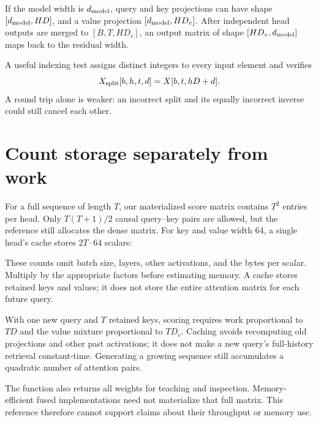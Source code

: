 
If the model width is $d_{\rm model}$, query and key projections can have shape $[d_{\rm model},HD]$, and a value projection $[d_{\rm model},HD_v]$. After independent head outputs are merged to $[B,T,HD_v]$, an output matrix of shape $[HD_v,d_{\rm model}]$ maps back to the residual width.

A useful indexing test assigns distinct integers to every input element and verifies
\begin{equation}
X_{\rm split}[b,h,t,d]=X[b,t,hD+d].
\end{equation}
A round trip alone is weaker: an incorrect split and its equally incorrect inverse could still cancel each other.

\section{Count storage separately from work}

For a full sequence of length $T$, our materialized score matrix contains $T^2$ entries per head. Only $T(T+1)/2$ causal query--key pairs are allowed, but the reference still allocates the dense matrix. For key and value width 64, a single head's cache stores $2T\cdot64$ scalars:

\begin{center}\end{center}

These counts omit batch size, layers, other activations, and the bytes per scalar. Multiply by the appropriate factors before estimating memory. A cache stores retained keys and values; it does not store the entire attention matrix for each future query.

With one new query and $T$ retained keys, scoring requires work proportional to $TD$ and the value mixture proportional to $TD_v$. Caching avoids recomputing old projections and other past activations; it does not make a new query's full-history retrieval constant-time. Generating a growing sequence still accumulates a quadratic number of attention pairs.

The function also returns all weights for teaching and inspection. Memory-efficient fused implementations need not materialize that full matrix. This reference therefore cannot support claims about their throughput or memory use.

